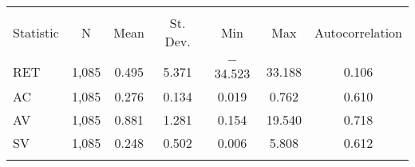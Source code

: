 
  \begin{tabular}{@{\extracolsep{5pt}}lcccccc} 
\hline\\[-1.8ex] 
Statistic & \multicolumn{1}{c}{N} & \multicolumn{1}{c}{Mean} & \multicolumn{1}{c}{St. Dev.} & \multicolumn{1}{c}{Min} & \multicolumn{1}{c}{Max} & \multicolumn{1}{c}{Autocorrelation}\\ 
\hline \\[-1.8ex] 
RET & 1,085 & 0.495 & 5.371 & $-$34.523 & 33.188 & 0.106\\ 
AC & 1,085 & 0.276 & 0.134 & 0.019 & 0.762 & 0.610\\ 
AV & 1,085 & 0.881 & 1.281 & 0.154 & 19.540 & 0.718\\ 
SV & 1,085 & 0.248 & 0.502 & 0.006 & 5.808 & 0.612\\ 
\hline \\[-1.8ex] 
\end{tabular}